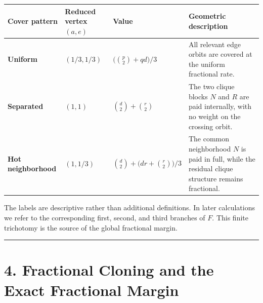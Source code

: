 \documentclass[
  american,
  11pt,
  a4paper,
]{article}
\newcounter{none} %
\begin{document}
{\def\LTcaptype{none} %
\begin{longtable}[]{@{}
  >{\raggedright\arraybackslash}p{}
  >{\raggedleft\arraybackslash}p{}
  >{\raggedleft\arraybackslash}p{}
  >{\raggedright\arraybackslash}p{}@{}}
\toprule\noalign{}
\begin{minipage}[b]{\linewidth}\raggedright
Cover pattern
\end{minipage} & \begin{minipage}[b]{\linewidth}\raggedleft
Reduced vertex \((a,e)\)
\end{minipage} & \begin{minipage}[b]{\linewidth}\raggedleft
Value
\end{minipage} & \begin{minipage}[b]{\linewidth}\raggedright
Geometric description
\end{minipage} \\
\midrule\noalign{}
\endhead
\bottomrule\noalign{}
\endlastfoot
\textbf{Uniform} & \((1/3,1/3)\) & \(\bigl(\binom p2+qd\bigr)/3\) & All relevant edge orbits are covered at the uniform fractional rate. \\
\textbf{Separated} & \((1,1)\) & \(\binom d2+\binom r2\) & The two clique blocks \(N\) and \(R\) are paid internally, with no weight on the crossing orbit. \\
\textbf{Hot neighborhood} & \((1,1/3)\) & \(\binom d2+\bigl(dr+\binom r2\bigr)/3\) & The common neighborhood \(N\) is paid in full, while the residual clique structure remains fractional. \\
\end{longtable}
}

The labels are descriptive rather than additional definitions. In later calculations we refer to the corresponding first, second, and third branches of \(F\). This finite trichotomy is the source of the global fractional margin.

\begin{center}\rule{0.5\linewidth}{0.5pt}\end{center}

\section{4. Fractional Cloning and the Exact Fractional Margin}\label{fractional-cloning-and-the-exact-fractional-margin}
\end{document}
